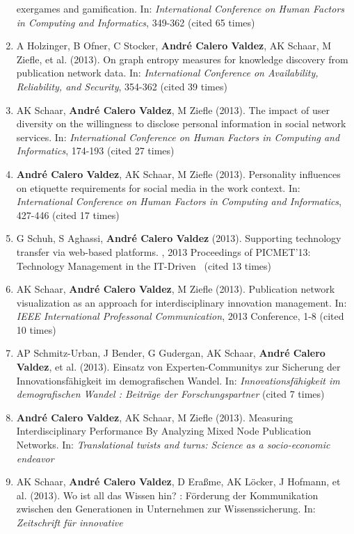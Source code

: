 \documentclass[11pt,a4paper,sans]{moderncv}
\begin{document}
\begin{enumerate}
  exergames and gamification. In: \emph{International Conference on
  Human Factors in Computing and Informatics}, 349-362 (cited 65 times)
\item
  A Holzinger, B Ofner, C Stocker, \textbf{André Calero Valdez}, AK
  Schaar, M Ziefle, et al. (2013). On graph entropy measures for
  knowledge discovery from publication network data. In:
  \emph{International Conference on Availability, Reliability, and
  Security}, 354-362 (cited 39 times)
\item
  AK Schaar, \textbf{André Calero Valdez}, M Ziefle (2013). The impact
  of user diversity on the willingness to disclose personal information
  in social network services. In: \emph{International Conference on
  Human Factors in Computing and Informatics}, 174-193 (cited 27 times)
\item
  \textbf{André Calero Valdez}, AK Schaar, M Ziefle (2013). Personality
  influences on etiquette requirements for social media in the work
  context. In: \emph{International Conference on Human Factors in
  Computing and Informatics}, 427-446 (cited 17 times)
\item
  G Schuh, S Aghassi, \textbf{André Calero Valdez} (2013). Supporting
  technology transfer via web-based platforms. , 2013 Proceedings of
  PICMET'13: Technology Management in the IT-Driven~ (cited 13 times)
\item
  AK Schaar, \textbf{André Calero Valdez}, M Ziefle (2013). Publication
  network visualization as an approach for interdisciplinary innovation
  management. In: \emph{IEEE International Professonal Communication},
  2013 Conference, 1-8 (cited 10 times)
\item
  AP Schmitz-Urban, J Bender, G Gudergan, AK Schaar, \textbf{André
  Calero Valdez}, et al. (2013). Einsatz von Experten-Communitys zur
  Sicherung der Innovationsfähigkeit im demografischen Wandel. In:
  \emph{Innovationsfähigkeit im demografischen Wandel : Beiträge der
  Forschungspartner} (cited 7 times)
\item
  \textbf{André Calero Valdez}, AK Schaar, M Ziefle (2013). Measuring
  Interdisciplinary Performance By Analyzing Mixed Node Publication
  Networks. In: \emph{Translational twists and turns: Science as a
  socio-economic endeavor}
\item
  AK Schaar, \textbf{André Calero Valdez}, D Eraßme, AK Löcker, J
  Hofmann, et al. (2013). Wo ist all das Wissen hin? : Förderung der
  Kommunikation zwischen den Generationen in Unternehmen zur
  Wissenssicherung. In: \emph{Zeitschrift für innovative
}
\end{enumerate}
\end{document}
